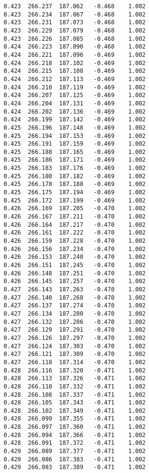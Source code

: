 \begin{verbatim}
   0.423  266.237  187.062   -0.468    1.002
   0.423  266.234  187.067   -0.468    1.002
   0.423  266.231  187.073   -0.468    1.002
   0.423  266.229  187.079   -0.468    1.002
   0.423  266.226  187.085   -0.468    1.002
   0.424  266.223  187.090   -0.468    1.002
   0.424  266.221  187.096   -0.469    1.002
   0.424  266.218  187.102   -0.469    1.002
   0.424  266.215  187.108   -0.469    1.002
   0.424  266.212  187.113   -0.469    1.002
   0.424  266.210  187.119   -0.469    1.002
   0.424  266.207  187.125   -0.469    1.002
   0.424  266.204  187.131   -0.469    1.002
   0.424  266.202  187.136   -0.469    1.002
   0.424  266.199  187.142   -0.469    1.002
   0.425  266.196  187.148   -0.469    1.002
   0.425  266.194  187.153   -0.469    1.002
   0.425  266.191  187.159   -0.469    1.002
   0.425  266.188  187.165   -0.469    1.002
   0.425  266.186  187.171   -0.469    1.002
   0.425  266.183  187.176   -0.469    1.002
   0.425  266.180  187.182   -0.469    1.002
   0.425  266.178  187.188   -0.469    1.002
   0.425  266.175  187.194   -0.469    1.002
   0.425  266.172  187.199   -0.469    1.002
   0.426  266.169  187.205   -0.470    1.002
   0.426  266.167  187.211   -0.470    1.002
   0.426  266.164  187.217   -0.470    1.002
   0.426  266.161  187.222   -0.470    1.002
   0.426  266.159  187.228   -0.470    1.002
   0.426  266.156  187.234   -0.470    1.002
   0.426  266.153  187.240   -0.470    1.002
   0.426  266.151  187.245   -0.470    1.002
   0.426  266.148  187.251   -0.470    1.002
   0.426  266.145  187.257   -0.470    1.002
   0.427  266.143  187.263   -0.470    1.002
   0.427  266.140  187.268   -0.470    1.002
   0.427  266.137  187.274   -0.470    1.002
   0.427  266.134  187.280   -0.470    1.002
   0.427  266.132  187.286   -0.470    1.002
   0.427  266.129  187.291   -0.470    1.002
   0.427  266.126  187.297   -0.470    1.002
   0.427  266.124  187.303   -0.470    1.002
   0.427  266.121  187.309   -0.470    1.002
   0.427  266.118  187.314   -0.470    1.002
   0.428  266.116  187.320   -0.471    1.002
   0.428  266.113  187.326   -0.471    1.002
   0.428  266.110  187.332   -0.471    1.002
   0.428  266.108  187.337   -0.471    1.002
   0.428  266.105  187.343   -0.471    1.002
   0.428  266.102  187.349   -0.471    1.002
   0.428  266.099  187.355   -0.471    1.002
   0.428  266.097  187.360   -0.471    1.002
   0.428  266.094  187.366   -0.471    1.002
   0.428  266.091  187.372   -0.471    1.002
   0.429  266.089  187.377   -0.471    1.002
   0.429  266.086  187.383   -0.471    1.002
   0.429  266.083  187.389   -0.471    1.002

\end{verbatim}

